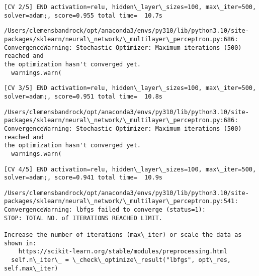 \documentclass[11pt]{article}
\begin{document}
    \begin{Verbatim}[commandchars=\\\{\}]
[CV 2/5] END activation=relu, hidden\_layer\_sizes=100, max\_iter=500,
solver=adam;, score=0.955 total time=  10.7s
    \end{Verbatim}

    \begin{Verbatim}[commandchars=\\\{\}]
/Users/clemensbandrock/opt/anaconda3/envs/py310/lib/python3.10/site-
packages/sklearn/neural\_network/\_multilayer\_perceptron.py:686:
ConvergenceWarning: Stochastic Optimizer: Maximum iterations (500) reached and
the optimization hasn't converged yet.
  warnings.warn(
    \end{Verbatim}

    \begin{Verbatim}[commandchars=\\\{\}]
[CV 3/5] END activation=relu, hidden\_layer\_sizes=100, max\_iter=500,
solver=adam;, score=0.951 total time=  10.8s
    \end{Verbatim}

    \begin{Verbatim}[commandchars=\\\{\}]
/Users/clemensbandrock/opt/anaconda3/envs/py310/lib/python3.10/site-
packages/sklearn/neural\_network/\_multilayer\_perceptron.py:686:
ConvergenceWarning: Stochastic Optimizer: Maximum iterations (500) reached and
the optimization hasn't converged yet.
  warnings.warn(
    \end{Verbatim}

    \begin{Verbatim}[commandchars=\\\{\}]
[CV 4/5] END activation=relu, hidden\_layer\_sizes=100, max\_iter=500,
solver=adam;, score=0.941 total time=  10.9s
    \end{Verbatim}

    \begin{Verbatim}[commandchars=\\\{\}]
/Users/clemensbandrock/opt/anaconda3/envs/py310/lib/python3.10/site-
packages/sklearn/neural\_network/\_multilayer\_perceptron.py:541:
ConvergenceWarning: lbfgs failed to converge (status=1):
STOP: TOTAL NO. of ITERATIONS REACHED LIMIT.

Increase the number of iterations (max\_iter) or scale the data as shown in:
    https://scikit-learn.org/stable/modules/preprocessing.html
  self.n\_iter\_ = \_check\_optimize\_result("lbfgs", opt\_res, self.max\_iter)
    \end{Verbatim}
\end{document}
